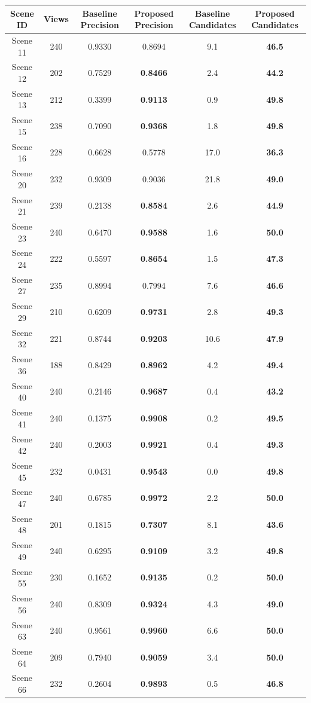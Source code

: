 \begin{tabular}{cccccc}
\hline
Scene ID & Views & Baseline Precision & Proposed Precision & Baseline Candidates & Proposed Candidates \\
\hline
Scene 11 & 240 & 0.9330 & 0.8694 & 9.1 & \textbf{46.5} \\
Scene 12 & 202 & 0.7529 & \textbf{0.8466} & 2.4 & \textbf{44.2} \\
Scene 13 & 212 & 0.3399 & \textbf{0.9113} & 0.9 & \textbf{49.8} \\
Scene 15 & 238 & 0.7090 & \textbf{0.9368} & 1.8 & \textbf{49.8} \\
Scene 16 & 228 & 0.6628 & 0.5778 & 17.0 & \textbf{36.3} \\
Scene 20 & 232 & 0.9309 & 0.9036 & 21.8 & \textbf{49.0} \\
Scene 21 & 239 & 0.2138 & \textbf{0.8584} & 2.6 & \textbf{44.9} \\
Scene 23 & 240 & 0.6470 & \textbf{0.9588} & 1.6 & \textbf{50.0} \\
Scene 24 & 222 & 0.5597 & \textbf{0.8654} & 1.5 & \textbf{47.3} \\
Scene 27 & 235 & 0.8994 & 0.7994 & 7.6 & \textbf{46.6} \\
Scene 29 & 210 & 0.6209 & \textbf{0.9731} & 2.8 & \textbf{49.3} \\
Scene 32 & 221 & 0.8744 & \textbf{0.9203} & 10.6 & \textbf{47.9} \\
Scene 36 & 188 & 0.8429 & \textbf{0.8962} & 4.2 & \textbf{49.4} \\
Scene 40 & 240 & 0.2146 & \textbf{0.9687} & 0.4 & \textbf{43.2} \\
Scene 41 & 240 & 0.1375 & \textbf{0.9908} & 0.2 & \textbf{49.5} \\
Scene 42 & 240 & 0.2003 & \textbf{0.9921} & 0.4 & \textbf{49.3} \\
Scene 45 & 232 & 0.0431 & \textbf{0.9543} & 0.0 & \textbf{49.8} \\
Scene 47 & 240 & 0.6785 & \textbf{0.9972} & 2.2 & \textbf{50.0} \\
Scene 48 & 201 & 0.1815 & \textbf{0.7307} & 8.1 & \textbf{43.6} \\
Scene 49 & 240 & 0.6295 & \textbf{0.9109} & 3.2 & \textbf{49.8} \\
Scene 55 & 230 & 0.1652 & \textbf{0.9135} & 0.2 & \textbf{50.0} \\
Scene 56 & 240 & 0.8309 & \textbf{0.9324} & 4.3 & \textbf{49.0} \\
Scene 63 & 240 & 0.9561 & \textbf{0.9960} & 6.6 & \textbf{50.0} \\
Scene 64 & 209 & 0.7940 & \textbf{0.9059} & 3.4 & \textbf{50.0} \\
Scene 66 & 232 & 0.2604 & \textbf{0.9893} & 0.5 & \textbf{46.8} \\
\hline
\end{tabular}
